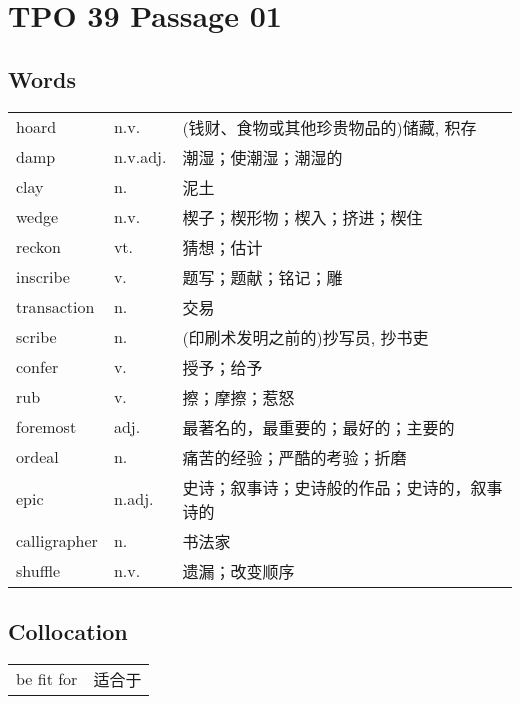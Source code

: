 \section{TPO 39 Passage 01}

\subsection{Words}

\begin{tabular}{lll}
    hoard        & n.v.     & (钱财、食物或其他珍贵物品的)储藏, 积存  \\
    damp         & n.v.adj. & 潮湿；使潮湿；潮湿的             \\
    clay         & n.       & 泥土                     \\
    wedge        & n.v.     & 楔子；楔形物；楔入；挤进；楔住        \\
    reckon       & vt.      & 猜想；估计                  \\
    inscribe     & v.       & 题写；题献；铭记；雕             \\
    transaction  & n.       & 交易                     \\
    scribe       & n.       & (印刷术发明之前的)抄写员, 抄书吏     \\
    confer       & v.       & 授予；给予                  \\
    rub          & v.       & 擦；摩擦；惹怒                \\
    foremost     & adj.     & 最著名的，最重要的；最好的；主要的      \\
    ordeal       & n.       & 痛苦的经验；严酷的考验；折磨         \\
    epic         & n.adj.   & 史诗；叙事诗；史诗般的作品；史诗的，叙事诗的 \\
    calligrapher & n.       & 书法家                    \\
    shuffle      & n.v.     & 遗漏；改变顺序                \\
\end{tabular}

\subsection{Collocation}

\begin{tabular}{ll}
    be fit for & 适合于 \\
\end{tabular}

